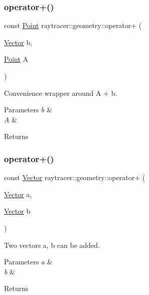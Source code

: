 \subsubsection{\texorpdfstring{operator+()}{operator+()}\hspace{0.1cm}{\footnotesize\ttfamily [2/3]}}
{\footnotesize\ttfamily const \hyperlink{classraytracer_1_1geometry_1_1Point}{Point} raytracer\+::geometry\+::operator+ (\begin{DoxyParamCaption}\item[{\hyperlink{classraytracer_1_1geometry_1_1Vector}{Vector}}]{b,  }\item[{\hyperlink{classraytracer_1_1geometry_1_1Point}{Point}}]{A }\end{DoxyParamCaption})}



Convenience wrapper around A + b. 


\begin{DoxyParams}{Parameters}
{\em b} & \\
\hline
{\em A} & \\
\hline
\end{DoxyParams}
\begin{DoxyReturn}{Returns}

\end{DoxyReturn}
\mbox{\label{namespaceraytracer_1_1geometry_a43e318baa7b3ea626fcf42c80f2e86c4}} 
\subsubsection{\texorpdfstring{operator+()}{operator+()}\hspace{0.1cm}{\footnotesize\ttfamily [3/3]}}
{\footnotesize\ttfamily const \hyperlink{classraytracer_1_1geometry_1_1Vector}{Vector} raytracer\+::geometry\+::operator+ (\begin{DoxyParamCaption}\item[{\hyperlink{classraytracer_1_1geometry_1_1Vector}{Vector}}]{a,  }\item[{\hyperlink{classraytracer_1_1geometry_1_1Vector}{Vector}}]{b }\end{DoxyParamCaption})}



Two vectors a, b can be added. 


\begin{DoxyParams}{Parameters}
{\em a} & \\
\hline
{\em b} & \\
\hline
\end{DoxyParams}
\begin{DoxyReturn}{Returns}

\end{DoxyReturn}
\mbox{\label{namespaceraytracer_1_1geometry_a019177298d61bc227f55b0d51a83f60e}} 
